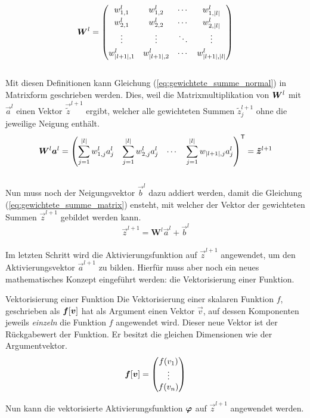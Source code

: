 \begin{equation*}
  \bm{W}^l =
  \begin{pmatrix}
    w_{1,1}^l & w_{1,2}^l & \cdots & w_{1,|l|}^l \\[0.3em]
    w_{2,1}^l & w_{2,2}^l & \cdots & w_{2,|l|}^l \\[0.3em]
    \vdots & \vdots & \ddots & \vdots \\[0.3em]
    w_{|l+1|,1}^l & w_{|l+1|,2}^l & \cdots & w_{|l+1|,|l|}^l
  \end{pmatrix}
\end{equation*}
\\
Mit diesen Definitionen kann Gleichung (\ref{eq:gewichtete_summe_normal}) in
Matrixform geschrieben werden. Dies, weil die Matrixmultiplikation von $\bm{W}^l$ mit
$\vec{a}^{l}$ einen Vektor $\vec{\tilde{z}}^{l+1}$ ergibt, welcher alle gewichteten
Summen $\tilde{z}_j^{l+1}$ ohne die jeweilige Neigung enthält.
\\
\begin{equation*}
  \bm{W}^l \bm{a}^{l} = \begin{pmatrix}\displaystyle \sum_{j=1}^{|l|} w_{1,j}^l a_j^l &\displaystyle \sum_{j=1}^{|l|} w_{2,j}^l a_j^l & \cdots &\displaystyle \sum_{j=1}^{|l|} w_{|l+1|,j} a_j^l \end{pmatrix}^{\mathsf{T}} = \bm{\tilde{z}}^{l+1}
\end{equation*}
\\
Nun muss noch der Neigungsvektor $\vec{b}^l$ dazu addiert werden, damit die
Gleichung (\ref{eq:gewichtete_summe_matrix}) ensteht, mit welcher der
Vektor der gewichteten Summen $\vec{z}^{l+1}$ gebildet werden kann.
\\
\begin{equation}\tag{FP1a}\label{eq:gewichtete_summe_matrix}
  \vec{z}^{l+1} = \mathbf{W}^{l} \vec{a}^{l} + \vec{b}^{l}
\end{equation}
\\
Im letzten Schritt wird die Aktivierungsfunktion auf $\vec{z}^{l+1}$
angewendet, um den Aktivierungsvektor $\vec{a}^{l+1}$ zu bilden.
Hierfür muss aber noch ein neues mathematisches
Konzept eingeführt werden: die Vektorisierung einer Funktion.
\para{}

\begin{defbox}{Vektorisierung einer Funktion}
  Die Vektorisierung einer skalaren Funktion $f$, geschrieben als
  $\bm{f}[\bm{v}]$ hat als Argument einen Vektor $\vec{v}$, auf dessen
  Komponenten jeweils \textit{einzeln} die Funktion $f$ angewendet wird. Dieser neue
  Vektor ist der Rückgabewert der Funktion. Er besitzt die gleichen Dimensionen
  wie der Argumentvektor.
  \\
  \begin{equation*}
    \bm{f}[\bm{v}]=
    \begin{pmatrix}
      f(v_1)\\
      \vdots \\
      f(v_n)\\
    \end{pmatrix}
  \end{equation*}
\end{defbox}
\para{}
Nun kann die vektorisierte Aktivierungsfunktion $\bm{\varphi}$ auf
$\vec{z}^{l+1}$ angewendet werden.

